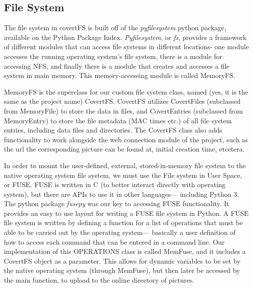 \subsection{File System}

The file system in covertFS is built off of the \textit{pyfilesystem} python package, available on the Python Package Index. \textit{Pyfilesystem}, or \textit{fs}, provides a framework of different modules that can access file systems in different locations- one module accesses the running operating system's file system, there is a module for accessing NFS, and finally there is a module that creates and accesses a file system in main memory. This memory-accessing module is called MemoryFS. 

MemoryFS is the superclass for our custom file system class, named (yes, it is the same as the project name) CovertFS. CovertFS utilizes CovertFiles (subclassed from MemoryFile) to store the data in files, and CovertEntries (subclassed from MemoryEntry) to store the file metadata (MAC times etc.) of all file system entries, including data files and directories. The CovertFS class also adds functionality to work alongside the web connection module of the project, such as the url the corresponding picture can be found at, initial creation time, etcetera. 

In order to mount the user-defined, external, stored-in-memory file system to the native operating system file system, we must use the File system in User Space, or FUSE. FUSE is written in C (to better interact directly with operating system), but there are APIs to use it in other languages--- including Python 3. The python package \textit{fusepy} was our key to accessing FUSE functionality. It provides an easy to use layout for writing a FUSE file system in Python. A FUSE file system is written by defining a function for a list of operations that must be able to be carried out by the operating system--- basically a user definition of how to access each command that can be entered in a command line. Our implementation of this OPERATIONS class is called MemFuse, and it includes a CovertFS object as a parameter. This allows for dynamic variables to be set by the native operating system (through MemFuse), but then later be accessed by the main function, to upload to the online directory of pictures.